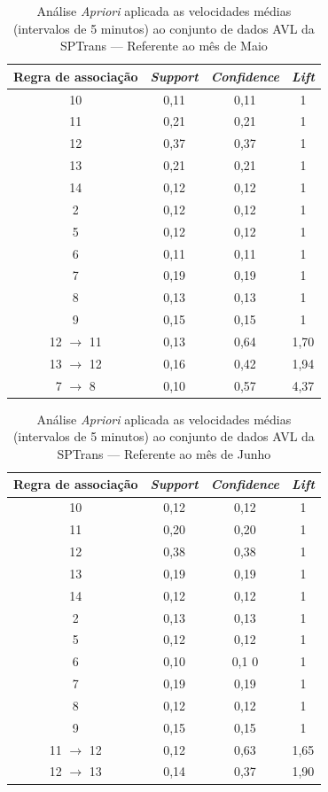 \documentclass[
	12pt,				%
	oneside,			%
	a4paper,			%
	english,			%
	brazil				%
	]{abntex2ppgsi}
\begin{document}
{{{\begin{apendicesenv}
\begin{table}[!htb]
\centering
\caption {Análise \textit{Apriori} aplicada as velocidades médias (intervalos de 5 minutos) ao conjunto de dados AVL da SPTrans --- Referente ao mês de Maio}
\label {tab:aprioriMay}
\begin{tabular}{c|c|c|c}
\toprule
\textbf{Regra de associação} & \textit{\textbf{Support}} & \textit{\textbf{Confidence}} & \textit{\textbf{Lift}} \\
\midrule
10 &  0,11 &  0,11 &  1\\
\hline
11 &  0,21 &  0,21 &  1\\
\hline
12 &  0,37 &  0,37 &  1\\
\hline
13 &  0,21 &  0,21 &  1\\
\hline
14 &  0,12 &  0,12 &  1\\
\hline
2 &  0,12 &  0,12 &  1\\
\hline
5 &  0,12 &  0,12 &  1\\
\hline
6 &  0,11 &  0,11 &  1\\
\hline
7 &  0,19 &  0,19 &  1\\
\hline
8 &  0,13 &  0,13 &  1\\
\hline
9 &  0,15 &  0,15 &  1\\
\hline
12 $\rightarrow$ 11 &  0,13 &  0,64 &  1,70\\
\hline
13 $\rightarrow$ 12 &  0,16 &  0,42 &  1,94\\
\hline
7 $\rightarrow$ 8 &  0,10 &  0,57 &  4,37\\
\bottomrule
\end{tabular}
\end{table}

\begin{table}[!htb]
\centering
\caption {Análise \textit{Apriori} aplicada as velocidades médias (intervalos de 5 minutos) ao conjunto de dados AVL da SPTrans --- Referente ao mês de Junho}
\label {tab:aprioriJune}
\begin{tabular}{c|c|c|c}
\toprule
\textbf{Regra de associação} & \textit{\textbf{Support}} & \textit{\textbf{Confidence}} & \textit{\textbf{Lift}} \\
\midrule
10 &  0,12 &  0,12 &  1\\
\hline
11 &  0,20 &  0,20 &  1\\
\hline
12 &  0,38 &  0,38 &  1\\
\hline
13 &  0,19 &  0,19 &  1\\
\hline
14 &  0,12 &  0,12 &  1\\
\hline
2 &  0,13 &  0,13 &  1\\
\hline
5 &  0,12 &  0,12 &  1\\
\hline
6 &  0,10 &  0,1 0&  1\\
\hline
7 &  0,19 &  0,19 &  1\\
\hline
8 &  0,12 &  0,12 &  1\\
\hline
9 &  0,15 &  0,15 &  1\\
\hline
11 $\rightarrow$ 12 &  0,12 &  0,63 &  1,65\\
\hline
12 $\rightarrow$ 13 &  0,14 &  0,37 &  1,90\\
\bottomrule
\end{tabular}
\end{table}


\end{apendicesenv}}}}
\end{document}
